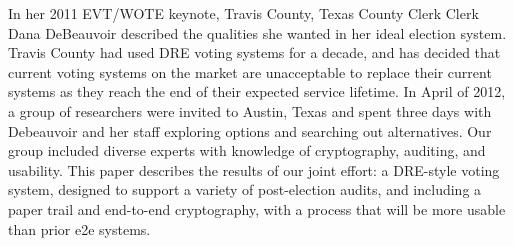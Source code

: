 In her 2011 EVT/WOTE keynote, Travis County, Texas County Clerk Clerk
Dana DeBeauvoir described the qualities she wanted in her ideal election system.
Travis County had used DRE voting systems for a decade, and has
decided that current voting systems on the market are unacceptable
to replace their current systems as they reach the end of their
expected service lifetime.
In April of 2012, a group of researchers were invited to Austin, Texas
and spent three days with   Debeauvoir and her staff exploring options and
searching out alternatives.  
Our group included diverse experts with
knowledge of cryptography, auditing, and usability. This paper
describes the results of our joint effort: a DRE-style voting
system, designed to support a variety of post-election audits, and
including a paper trail and end-to-end cryptography, with a process
that will be more usable than prior e2e systems.
